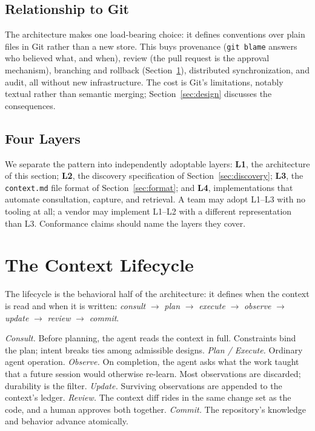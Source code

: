 \documentclass[sigconf,screen]{acmart}
\newcommand{\ctx}{\texttt{context.md}}
\begin{document}
\subsection{Relationship to Git}
The architecture makes one load-bearing choice: it defines conventions over plain
files in Git rather than a new store. This buys provenance (\texttt{git blame}
answers who believed what, and when), review (the pull request is the approval
mechanism), branching and rollback (Section~\ref{sec:lifecycle}), distributed
synchronization, and audit, all without new infrastructure. The cost is Git's
limitations, notably textual rather than semantic merging;
Section~\ref{sec:design} discusses the consequences.

\subsection{Four Layers}
We separate the pattern into independently adoptable layers: \textbf{L1}, the
architecture of this section; \textbf{L2}, the discovery specification of
Section~\ref{sec:discovery}; \textbf{L3}, the \ctx{} file format of
Section~\ref{sec:format}; and \textbf{L4}, implementations that automate
consultation, capture, and retrieval. A team may adopt L1--L3 with no tooling at
all; a vendor may implement L1--L2 with a different representation than L3.
Conformance claims should name the layers they cover.

\section{The Context Lifecycle}\label{sec:lifecycle}
The lifecycle is the behavioral half of the architecture: it defines when the
context is read and when it is written: \emph{consult} $\rightarrow$ \emph{plan}
$\rightarrow$ \emph{execute} $\rightarrow$ \emph{observe} $\rightarrow$
\emph{update} $\rightarrow$ \emph{review} $\rightarrow$ \emph{commit}.

\emph{Consult.} Before planning, the agent reads the context in full. Constraints
bind the plan; intent breaks ties among admissible designs. \emph{Plan /
Execute.} Ordinary agent operation. \emph{Observe.} On completion, the agent asks
what the work taught that a future session would otherwise re-learn. Most
observations are discarded; durability is the filter. \emph{Update.} Surviving
observations are appended to the context's ledger. \emph{Review.} The context diff
rides in the same change set as the code, and a human approves both together.
\emph{Commit.} The repository's knowledge and behavior advance atomically.
\end{document}
